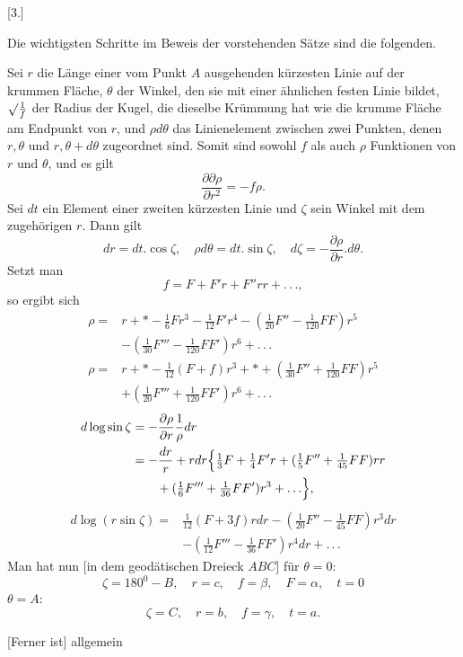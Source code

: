\par{}\begin{center}[3.]\end{center}
\noindent\hspace*{1.2em}Die wichtigsten Schritte im Beweis der vorstehenden Sätze sind die folgenden.

Sei $r$ die Länge einer vom Punkt $A$ ausgehenden kürzesten Linie auf der krummen Fläche, $\theta$ der Winkel, den sie mit einer ähnlichen festen Linie bildet, $\mathord{\surd}\frac1f$ der Radius der Kugel, die dieselbe Krümmung hat wie die krumme Fläche am Endpunkt von $r$, und $\rho d\theta$ das Linienelement zwischen zwei Punkten, denen $r,\theta$ und $r,\theta+d\theta$ zugeordnet sind. Somit sind sowohl $f$ als auch $\rho$ Funktionen von $r$ und $\theta$, und es gilt
\[
\frac{\partial\partial\rho}{\partial r^2}=-f\rho.
\]
\indent Sei $dt$ ein Element einer zweiten kürzesten Linie und $\zeta$ sein Winkel mit dem zugehörigen $r$. Dann gilt
\[
dr=dt.\cos\zeta,\quad\rho d\theta=dt.\sin\zeta,\quad d\zeta=-\frac{\partial\rho}{\partial r}.d\theta.
\]
\noindent Setzt man
\[
f=F+F'r+F''rr+.\, .\, .,
\]
\noindent so ergibt sich
\[
\begin{aligned}
\rho={}&r+*-\tfrac16Fr^3-\tfrac1{12}F'r^4-(\tfrac1{20}F''-\tfrac1{120}FF)r^5\\
&-(\tfrac1{30}F'''-\tfrac1{120}FF')r^6+.\, .\, .\\
\rho={}&r+*-\tfrac1{12}(F+f)r^3+*+(\tfrac1{30}F''+\tfrac1{120}FF)r^5\\
&+(\tfrac1{20}F'''+\tfrac1{120}FF')r^6+.\, .\, .
\end{aligned}
\]
\[
\begin{aligned}
d\log\sin\zeta&=-\frac{\partial\rho}{\partial r}\frac1\rho dr\\
&=-\frac{dr}r+rdr\Bigl\{\tfrac13F+\tfrac14F'r+(\tfrac15F''+\tfrac1{45}FF)rr\\
&\qquad+(\tfrac16F'''+\tfrac1{36}FF')r^3+.\, .\, .\Bigr\},
\end{aligned}
\]
\[
\begin{aligned}
d\log(r\sin\zeta)={}&\tfrac1{12}(F+3f)rdr-(\tfrac1{20}F''-\tfrac1{45}FF)r^3dr\\
&-(\tfrac1{12}F'''-\tfrac1{36}FF')r^4dr+.\, .\, .
\end{aligned}
\]
\indent Man hat nun [in dem geodätischen Dreieck $ABC$] für $\theta=0$:
\[
\zeta=180^0-B,\quad r=c,\quad f=\beta,\quad F=\alpha,\quad t=0
\]
 $\theta=A$:
\[
\zeta=C,\quad r=b,\quad f=\gamma,\quad t=a.
\]
\begin{center}\end{center}
\noindent\hspace*{1.2em}[Ferner ist] allgemein
